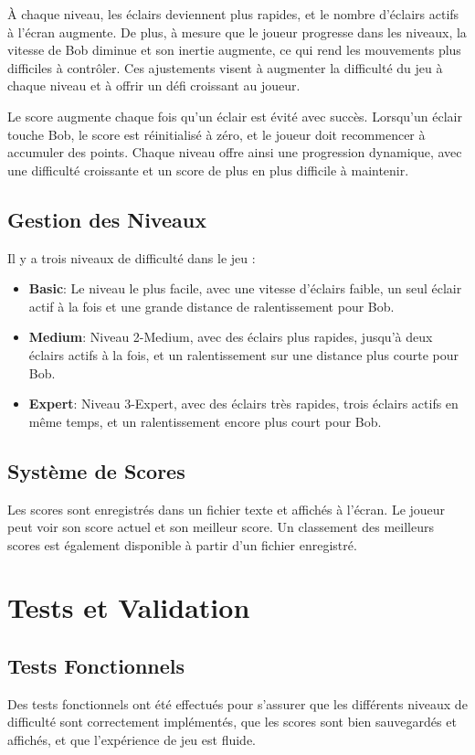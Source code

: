 \documentclass[a4paper,12pt]{article}
\begin{document}
	\noindent À chaque niveau, les éclairs deviennent plus rapides, et le nombre d'éclairs actifs à l'écran augmente. De plus, à mesure que le joueur progresse dans les niveaux, la vitesse de Bob diminue et son inertie augmente, ce qui rend les mouvements plus difficiles à contrôler. Ces ajustements visent à augmenter la difficulté du jeu à chaque niveau et à offrir un défi croissant au joueur.
	
	\noindent Le score augmente chaque fois qu'un éclair est évité avec succès. Lorsqu'un éclair touche Bob, le score est réinitialisé à zéro, et le joueur doit recommencer à accumuler des points. Chaque niveau offre ainsi une progression dynamique, avec une difficulté croissante et un score de plus en plus difficile à maintenir.
	
	\subsection{Gestion des Niveaux}
	\noindent Il y a trois niveaux de difficulté dans le jeu :
	
	\begin{itemize}
		\item \textbf{Basic}: Le niveau le plus facile, avec une vitesse d'éclairs faible, un seul éclair actif à la fois et une grande distance de ralentissement pour Bob.
		\item \textbf{Medium}: Niveau 2-Medium, avec des éclairs plus rapides, jusqu'à deux éclairs actifs à la fois, et un ralentissement sur une distance plus courte pour Bob.
		\item \textbf{Expert}: Niveau 3-Expert, avec des éclairs très rapides, trois éclairs actifs en même temps, et un ralentissement encore plus court pour Bob.
	\end{itemize}
	
	\subsection{Système de Scores}
	\noindent Les scores sont enregistrés dans un fichier texte et affichés à l'écran. Le joueur peut voir son score actuel et son meilleur score. Un classement des meilleurs scores est également disponible à partir d'un fichier enregistré.
	
	\newpage
	\section{Tests et Validation}
	
	\subsection{Tests Fonctionnels}
	Des tests fonctionnels ont été effectués pour s'assurer que les différents niveaux de difficulté sont correctement implémentés, que les scores sont bien sauvegardés et affichés, et que l'expérience de jeu est fluide.
	
\end{document}

